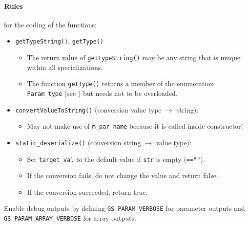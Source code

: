\paragraph{Rules} for the coding of the functions:
\begin{itemize}
  \item \lstinline|getTypeString()|, \lstinline|getType()|
    \begin{itemize}
      \item The return value of \lstinline|getTypeString()| may be any string that is unique within all specializations.
      \item The function \lstinline|getType()| returns a member of the enumeration \lstinline|Param_type| (see ) but needs not to be overloaded.
    \end{itemize}
  \item \lstinline|convertValueToString()| (conversion value type $\rightarrow$ string):
    \begin{itemize}
      \item May not make use of \lstinline|m_par_name| because it is called inside constructor!
    \end{itemize}
  \item \lstinline|static_deserialize()| (conversion string $\rightarrow$ value type):
    \begin{itemize}
      \item Set \lstinline|target_val| to the default value if \lstinline|str| is empty (\lstinline|==""|).
      \item If the conversion fails, do not change the value and return {\sffamily false}.
      \item If the conversion succeeded, return {\sffamily true}.
    \end{itemize}
\end{itemize}

Enable debug outputs by defining \lstinline|GS_PARAM_VERBOSE| for parameter outputs and \lstinline|GS_PARAM_ARRAY_VERBOSE| for array outputs.


